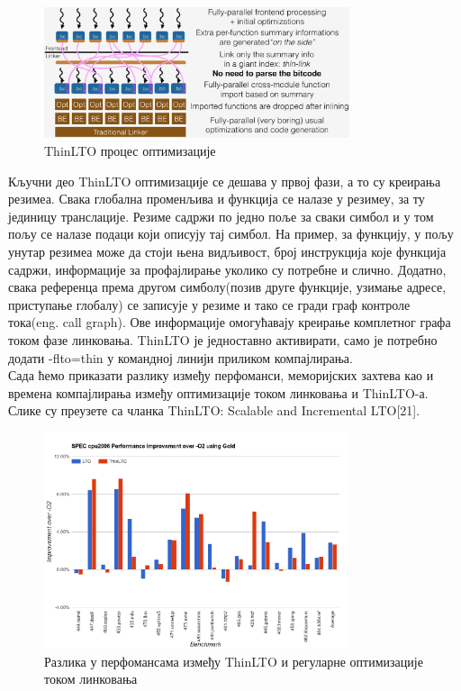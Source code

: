 \documentclass[12pt,oneside]{memoir}
\begin{document}
\begin{figure}[!ht]
  \centering
  \includegraphics[width=0.8\textwidth]{LTO_thin.png}
  \caption{ThinLTO процес оптимизације}
  \label{fig:grafikon}
\end{figure}

Кључни део ThinLTO оптимизације се дешава у првој фази, а то су креирања резимеа.
Свака глобална променљива и функција се налазе у резимеу, за ту јединицу транслације.
Резиме садржи по једно поље за сваки симбол и у том пољу
се налазе подаци који описују тај симбол.
На пример, за функцију, у пољу унутар резимеа може да стоји њена видљивост, 
број инструкција које функција садржи, информације за профајлирање уколико су потребне
и слично.
Додатно, свака референца према другом симболу(позив друге функције, узимање адресе,
приступање глобалу) се записује у резиме и тако се гради граф контроле тока(eng. call graph).
Ове информације омогућавају креирање комплетног графа током фазе линковања.
ThinLTO је једноставно активирати, само је потребно додати  -flto=thin у командној линији
приликом компајлирања.
\\
Сада ћемо приказати разлику између перфоманси, меморијских захтева као и времена
компајлирања између оптимизације током линковања и ThinLTO-а.
Слике су преузете са чланка ThinLTO: Scalable and Incremental LTO[21].

\begin{figure}[!ht]
  \centering
  \includegraphics[width=0.8\textwidth]{thin_perfomance.png}
  \caption{Разлика у перфомансама између ThinLTO и регуларне оптимизације током линковања }
  \label{fig:grafikon}
\end{figure}
\end{document}
